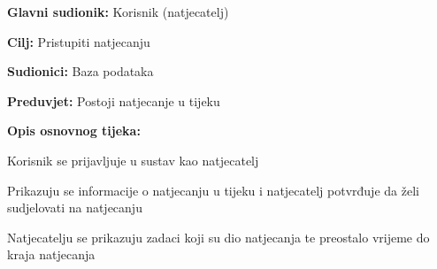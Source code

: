 					\noindent {}
					\begin{packed_item}
						
						\item \textbf{Glavni sudionik: }Korisnik (natjecatelj)
						\item \textbf{Cilj:} Pristupiti natjecanju 
						\item \textbf{Sudionici:} Baza podataka
						\item \textbf{Preduvjet:} Postoji natjecanje u tijeku
						\item \textbf{Opis osnovnog tijeka:}
						
						\item[] \begin{packed_enum}
							\item Korisnik se prijavljuje u sustav kao natjecatelj
							\item Prikazuju se informacije o natjecanju u tijeku i natjecatelj potvrđuje da želi sudjelovati na natjecanju 
							\item Natjecatelju se prikazuju zadaci koji su dio natjecanja te preostalo vrijeme do kraja natjecanja
						\end{packed_enum}
					\end{packed_item}
								
					
					

